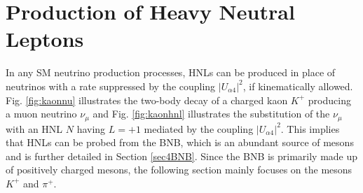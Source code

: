 
 
\section{Production of Heavy Neutral Leptons}
\label{sec2Production}
In any SM neutrino production processes, HNLs can be produced in place of neutrinos with a rate suppressed by the coupling $|U_{\alpha4}|^{2}$, if kinematically allowed. 
Fig. \ref{fig:kaonnu} illustrates the two-body decay of a charged kaon $K^+$ producing a muon neutrino $\nu_{\mu}$ and Fig. \ref{fig:kaonhnl} illustrates the substitution of the $\nu_{\mu}$ with an HNL $N$ having $L = +1$ mediated by the coupling $|U_{\alpha4}|^{2}$. 
This implies that HNLs can be probed from the BNB, which is an abundant source of mesons and is further detailed in Section \ref{sec4BNB}.
Since the BNB is primarily made up of positively charged mesons, the following section mainly focuses on the mesons $K^+$ and $\pi^+$.  

